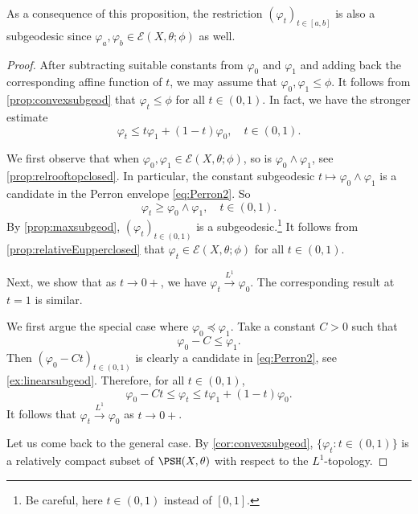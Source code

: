 As a consequence of this proposition, the restriction $(\varphi_t)_{t\in [a,b]}$ is also a subgeodesic since $\varphi_a,\varphi_b\in \mathcal{E}(X,\theta;\phi)$ as well.

\begin{proof}
    After subtracting suitable constants from $\varphi_0$ and $\varphi_1$ and adding back the corresponding affine function of $t$, we may assume that $\varphi_0,\varphi_1\leq \phi$. It follows from \cref{prop:convexsubgeod} that $\varphi_t\leq \phi$ for all $t\in (0,1)$. In fact, we have the stronger estimate
    \begin{equation}\label{eq:geodesicconvextemp1}
        \varphi_t\leq t\varphi_1+(1-t)\varphi_0,\quad t\in (0,1).
    \end{equation}

    We first observe that when $\varphi_0,\varphi_1\in \mathcal{E}(X,\theta;\phi)$, so is $\varphi_0\land \varphi_1$, see \cref{prop:relrooftopclosed}. In particular, the constant subgeodesic $t\mapsto \varphi_0\land \varphi_1$ is a candidate in the Perron envelope \eqref{eq:Perron2}. So
    \begin{equation}\label{eq:varphitgeqlandtemp1}
        \varphi_t\geq \varphi_0\land \varphi_1,\quad t\in (0,1).
    \end{equation}
    By \cref{prop:maxsubgeod}, $(\varphi_t)_{t\in (0,1)}$ is a subgeodesic.\footnote{Be careful, here $t\in (0,1)$ instead of $[0,1]$.}
    It follows from \cref{prop:relativeEupperclosed} that $\varphi_t\in \mathcal{E}(X,\theta;\phi)$ for all $t\in (0,1)$.

    Next, we show that as $t\to 0+$, we have $\varphi_t\xrightarrow{L^1}\varphi_0$. The corresponding result at $t=1$ is similar.

    We first argue the special case where $\varphi_0\preceq \varphi_1$. Take a constant $C>0$ such that
    \[
        \varphi_0-C\leq \varphi_1.
    \]
    Then $(\varphi_0-Ct)_{t\in (0,1)}$ is clearly a candidate in \eqref{eq:Perron2}, see \cref{ex:linearsubgeod}. Therefore, for all $t\in (0,1)$,
    \begin{equation}\label{eq:varphi0andvarphit}
        \varphi_0-Ct\leq \varphi_t\leq t\varphi_1+(1-t)\varphi_0.
    \end{equation}
    It follows that $\varphi_t\xrightarrow{L^1}\varphi_0$ as $t\to 0+$.

    Let us come back to the general case.
    By \cref{cor:convexsubgeod}, $\{\varphi_t:t\in (0,1)\}$ is a relatively compact subset of $\PSH(X,\theta)$ with respect to the $L^1$-topology.


\end{proof}
